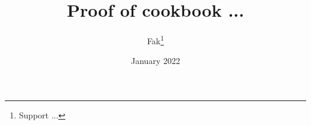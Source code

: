 \documentclass[11pt]{book}
\title{Proof of cookbook ...}
\author{Fak\thanks{Support ...}}
\date{January 2022}
\begin{document}
\maketitle %
\tableofcontents %

\providecommand{\tightlist}{%
	\setlength{\itemsep}{0pt}\setlength{\parskip}{0pt}}
\clearpage
\end{document}
